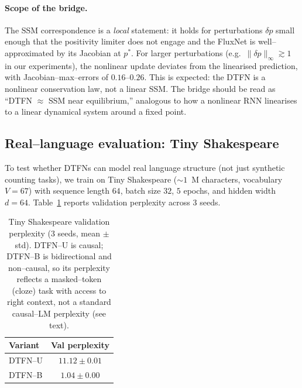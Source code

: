 \documentclass[10pt]{article}
\theoremstyle{definition}
\theoremstyle{remark}
\begin{document}
\paragraph{Scope of the bridge.}
The SSM correspondence is a \emph{local} statement: it holds for
perturbations $\delta p$ small enough that the positivity limiter
does not engage and the FluxNet is well--approximated by its Jacobian
at $p^*$.  For larger perturbations (e.g.\ $\|\delta p\|_\infty
\gtrsim 1$ in our experiments), the nonlinear update deviates from
the linearised prediction, with Jacobian--max--errors of $0.16$--$0.26$.
This is expected: the DTFN is a nonlinear conservation law, not a
linear SSM.  The bridge should be read as ``DTFN $\approx$ SSM near
equilibrium,'' analogous to how a nonlinear RNN linearises to a
linear dynamical system around a fixed point.

\subsection{Real--language evaluation: Tiny Shakespeare}
\label{sec:exp-shakespeare}

To test whether DTFNs can model real language structure (not just
synthetic counting tasks), we train on Tiny Shakespeare
($\sim 1$~M characters, vocabulary $V = 67$) with sequence length
$64$, batch size $32$, $5$ epochs, and hidden width $d = 64$.
Table~\ref{tab:shakespeare} reports validation perplexity across $3$
seeds.

\begin{table}[h]
  \centering
  \caption{Tiny Shakespeare validation perplexity ($3$ seeds, mean
    $\pm$ std).  DTFN--U is causal; DTFN--B is bidirectional and
    non--causal, so its perplexity reflects a masked--token (cloze)
    task with access to right context, not a standard causal--LM
    perplexity (see text).}
  \label{tab:shakespeare}
  \begin{tabular}{lc}
    \toprule
    Variant & Val perplexity \\
    \midrule
    DTFN--U     & $11.12 \pm 0.01$ \\
    DTFN--B     & $1.04 \pm 0.00$ \\
    \bottomrule
  \end{tabular}
\end{table}
\end{document}
